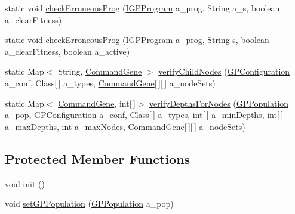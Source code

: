 \begin{DoxyCompactItemize}
\item 
static void \hyperlink{classorg_1_1jgap_1_1gp_1_1impl_1_1_g_p_genotype_a9d986d5030ce180fc402a2a73d22c42d}{check\-Erroneous\-Prog} (\hyperlink{interfaceorg_1_1jgap_1_1gp_1_1_i_g_p_program}{I\-G\-P\-Program} a\-\_\-prog, String a\-\_\-s, boolean a\-\_\-clear\-Fitness)
\item 
static void \hyperlink{classorg_1_1jgap_1_1gp_1_1impl_1_1_g_p_genotype_aa3bf0b50a73684ff3fe1177017cf9bb8}{check\-Erroneous\-Prog} (\hyperlink{interfaceorg_1_1jgap_1_1gp_1_1_i_g_p_program}{I\-G\-P\-Program} a\-\_\-prog, String s, boolean a\-\_\-clear\-Fitness, boolean a\-\_\-active)
\item 
static Map$<$ String, \hyperlink{classorg_1_1jgap_1_1gp_1_1_command_gene}{Command\-Gene} $>$ \hyperlink{classorg_1_1jgap_1_1gp_1_1impl_1_1_g_p_genotype_a77909da0c746ca16cdcbf0af9b1c0927}{verify\-Child\-Nodes} (\hyperlink{classorg_1_1jgap_1_1gp_1_1impl_1_1_g_p_configuration}{G\-P\-Configuration} a\-\_\-conf, Class\mbox{[}$\,$\mbox{]} a\-\_\-types, \hyperlink{classorg_1_1jgap_1_1gp_1_1_command_gene}{Command\-Gene}\mbox{[}$\,$\mbox{]}\mbox{[}$\,$\mbox{]} a\-\_\-node\-Sets)
\item 
static Map$<$ \hyperlink{classorg_1_1jgap_1_1gp_1_1_command_gene}{Command\-Gene}, int\mbox{[}$\,$\mbox{]}$>$ \hyperlink{classorg_1_1jgap_1_1gp_1_1impl_1_1_g_p_genotype_ad264330c888b133296578decc78f265e}{verify\-Depths\-For\-Nodes} (\hyperlink{classorg_1_1jgap_1_1gp_1_1impl_1_1_g_p_population}{G\-P\-Population} a\-\_\-pop, \hyperlink{classorg_1_1jgap_1_1gp_1_1impl_1_1_g_p_configuration}{G\-P\-Configuration} a\-\_\-conf, Class\mbox{[}$\,$\mbox{]} a\-\_\-types, int\mbox{[}$\,$\mbox{]} a\-\_\-min\-Depths, int\mbox{[}$\,$\mbox{]} a\-\_\-max\-Depths, int a\-\_\-max\-Nodes, \hyperlink{classorg_1_1jgap_1_1gp_1_1_command_gene}{Command\-Gene}\mbox{[}$\,$\mbox{]}\mbox{[}$\,$\mbox{]} a\-\_\-node\-Sets)
\end{DoxyCompactItemize}
\subsection*{Protected Member Functions}
\begin{DoxyCompactItemize}
\item 
void \hyperlink{classorg_1_1jgap_1_1gp_1_1impl_1_1_g_p_genotype_a6b017f0f0e028cc1a9164782c5ce5095}{init} ()
\item 
void \hyperlink{classorg_1_1jgap_1_1gp_1_1impl_1_1_g_p_genotype_a11dce8ec844c102bc151e4ab81c52ac7}{set\-G\-P\-Population} (\hyperlink{classorg_1_1jgap_1_1gp_1_1impl_1_1_g_p_population}{G\-P\-Population} a\-\_\-pop)
\end{DoxyCompactItemize}
